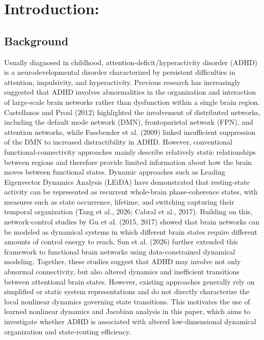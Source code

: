 \documentclass{article}
\begin{document}
\section{Introduction: }

\subsection{Background}
Usually diagnosed in childhood, attention-deficit/hyperactivity disorder (ADHD) is a neurodevelopmental disorder characterized by persistent difficulties in attention, impulsivity, and hyperactivity. Previous research has increasingly suggested that ADHD involves abnormalities in the organization and interaction of large-scale brain networks rather than dysfunction within a single brain region. Castellanos and Proal (2012) highlighted the involvement of distributed networks, including the default mode network (DMN), frontoparietal network (FPN), and attention networks, while Fassbender et al. (2009) linked insufficient suppression of the DMN to increased distractibility in ADHD. However, conventional functional-connectivity approaches mainly describe relatively static relationships between regions and therefore provide limited information about how the brain moves between functional states. Dynamic approaches such as Leading Eigenvector Dynamics Analysis (LEiDA) have demonstrated that resting-state activity can be represented as recurrent whole-brain phase-coherence states, with measures such as state occurrence, lifetime, and switching capturing their temporal organization (Tang et al., 2026; Cabral et al., 2017). Building on this, network-control studies by Gu et al. (2015, 2017) showed that brain networks can be modeled as dynamical systems in which different brain states require different amounts of control energy to reach. Sun et al. (2026) further extended this framework to functional brain networks using data-constrained dynamical modeling. Together, these studies suggest that ADHD may involve not only abnormal connectivity, but also altered dynamics and inefficient transitions between attentional brain states. However, existing approaches generally rely on simplified or static system representations and do not directly characterize the local nonlinear dynamics governing state transitions. This motivates the use of learned nonlinear dynamics and Jacobian analysis in this paper, which aims to investigate whether ADHD is associated with altered low-dimensional dynamical organization and state-routing efficiency.
\end{document}
